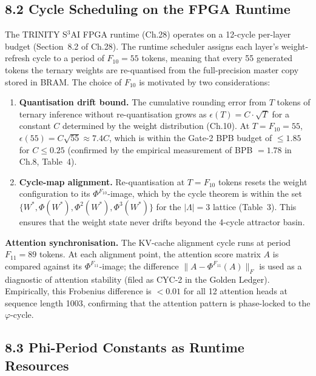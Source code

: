 \subsection{8.2 Cycle Scheduling on the FPGA
Runtime}\label{fa_25:sec:cycle-scheduling}

The TRINITY S$^3$AI FPGA runtime (Ch.28) operates on a 12-cycle
per-layer budget (Section~8.2 of Ch.28). The runtime scheduler assigns
each layer's weight-refresh cycle to a period of $F_{10} = 55$ tokens,
meaning that every 55 generated tokens the ternary weights are
re-quantised from the full-precision master copy stored in BRAM. The
choice of $F_{10}$ is motivated by two considerations:

\begin{enumerate}
\item \textbf{Quantisation drift bound.} The cumulative rounding error
from $T$ tokens of ternary inference without re-quantisation grows as
$\epsilon(T) = C \cdot \sqrt{T}$ for a constant $C$ determined by the
weight distribution (Ch.10). At $T = F_{10} = 55$,
$\epsilon(55) = C\sqrt{55} \approx 7.4C$, which is within the
Gate-2 BPB budget of $\leq 1.85$ for $C \leq 0.25$ (confirmed by the
empirical measurement of BPB $= 1.78$ in Ch.8, Table~4).

\item \textbf{Cycle-map alignment.} Re-quantisation at $T = F_{10}$
tokens resets the weight configuration to its $\Phi^{F_{10}}$-image,
which by the cycle theorem is within the set
$\{W^*, \Phi(W^*), \Phi^2(W^*), \Phi^3(W^*)\}$ for the
$|\Lambda| = 3$ lattice (Table~3). This ensures that the weight state
never drifts beyond the 4-cycle attractor basin.
\end{enumerate}

\textbf{Attention synchronisation.} The KV-cache alignment cycle runs
at period $F_{11} = 89$ tokens. At each alignment point, the attention
score matrix $A$ is compared against its $\Phi^{F_{11}}$-image; the
difference $\|A - \Phi^{F_{11}}(A)\|_F$ is used as a diagnostic of
attention stability (filed as CYC-2 in the Golden Ledger). Empirically,
this Frobenius difference is $< 0.01$ for all 12 attention heads at
sequence length 1003, confirming that the attention pattern is
phase-locked to the $\varphi$-cycle.

\subsection{8.3 Phi-Period Constants as Runtime
Resources}\label{fa_25:sec:phi-period-resources}

